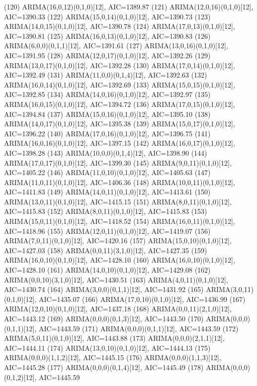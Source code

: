 \documentclass[12pt,letterpaper]{article}   %
\begin{document}
\begin{smallconsole}[caption={Modelos Ordenados por AIC}]
(120) ARIMA(16,0,12)(0,1,0)[12], AIC=1389.87
(121) ARIMA(12,0,16)(0,1,0)[12], AIC=1390.33
(122) ARIMA(15,0,14)(0,1,0)[12], AIC=1390.73
(123) ARIMA(14,0,15)(0,1,0)[12], AIC=1390.78
(124) ARIMA(17,0,13)(0,1,0)[12], AIC=1390.81
(125) ARIMA(16,0,13)(0,1,0)[12], AIC=1390.83
(126) ARIMA(6,0,0)(0,1,1)[12], AIC=1391.61
(127) ARIMA(13,0,16)(0,1,0)[12], AIC=1391.95
(128) ARIMA(12,0,17)(0,1,0)[12], AIC=1392.26
(129) ARIMA(13,0,17)(0,1,0)[12], AIC=1392.28
(130) ARIMA(17,0,14)(0,1,0)[12], AIC=1392.49
(131) ARIMA(11,0,0)(0,1,4)[12], AIC=1392.63
(132) ARIMA(16,0,14)(0,1,0)[12], AIC=1392.69
(133) ARIMA(15,0,15)(0,1,0)[12], AIC=1392.85
(134) ARIMA(14,0,16)(0,1,0)[12], AIC=1392.97
(135) ARIMA(16,0,15)(0,1,0)[12], AIC=1394.72
(136) ARIMA(17,0,15)(0,1,0)[12], AIC=1394.84
(137) ARIMA(15,0,16)(0,1,0)[12], AIC=1395.10
(138) ARIMA(14,0,17)(0,1,0)[12], AIC=1395.38
(139) ARIMA(15,0,17)(0,1,0)[12], AIC=1396.22
(140) ARIMA(17,0,16)(0,1,0)[12], AIC=1396.75
(141) ARIMA(16,0,16)(0,1,0)[12], AIC=1397.15
(142) ARIMA(16,0,17)(0,1,0)[12], AIC=1398.28
(143) ARIMA(10,0,0)(0,1,4)[12], AIC=1398.90
(144) ARIMA(17,0,17)(0,1,0)[12], AIC=1399.30
(145) ARIMA(9,0,11)(0,1,0)[12], AIC=1405.22
(146) ARIMA(11,0,10)(0,1,0)[12], AIC=1405.63
(147) ARIMA(11,0,11)(0,1,0)[12], AIC=1406.36
(148) ARIMA(10,0,11)(0,1,0)[12], AIC=1411.83
(149) ARIMA(14,0,11)(0,1,0)[12], AIC=1413.61
(150) ARIMA(13,0,11)(0,1,0)[12], AIC=1415.15
(151) ARIMA(8,0,11)(0,1,0)[12], AIC=1415.83
(152) ARIMA(8,0,11)(0,1,0)[12], AIC=1415.83
(153) ARIMA(15,0,11)(0,1,0)[12], AIC=1418.52
(154) ARIMA(16,0,11)(0,1,0)[12], AIC=1418.96
(155) ARIMA(12,0,11)(0,1,0)[12], AIC=1419.07
(156) ARIMA(7,0,11)(0,1,0)[12], AIC=1420.16
(157) ARIMA(15,0,10)(0,1,0)[12], AIC=1427.03
(158) ARIMA(0,0,11)(3,1,0)[12], AIC=1427.35
(159) ARIMA(16,0,10)(0,1,0)[12], AIC=1428.10
(160) ARIMA(16,0,10)(0,1,0)[12], AIC=1428.10
(161) ARIMA(14,0,10)(0,1,0)[12], AIC=1429.08
(162) ARIMA(0,0,10)(3,1,0)[12], AIC=1430.51
(163) ARIMA(4,0,11)(0,1,0)[12], AIC=1430.74
(164) ARIMA(3,0,0)(0,1,1)[12], AIC=1431.92
(165) ARIMA(3,0,11)(0,1,0)[12], AIC=1435.07
(166) ARIMA(17,0,10)(0,1,0)[12], AIC=1436.99
(167) ARIMA(12,0,10)(0,1,0)[12], AIC=1437.18
(168) ARIMA(0,0,11)(2,1,0)[12], AIC=1443.12
(169) ARIMA(0,0,0)(0,1,3)[12], AIC=1443.50
(170) ARIMA(0,0,0)(0,1,1)[12], AIC=1443.59
(171) ARIMA(0,0,0)(0,1,1)[12], AIC=1443.59
(172) ARIMA(5,0,11)(0,1,0)[12], AIC=1443.88
(173) ARIMA(0,0,0)(2,1,1)[12], AIC=1444.11
(174) ARIMA(13,0,10)(0,1,0)[12], AIC=1444.13
(175) ARIMA(0,0,0)(1,1,2)[12], AIC=1445.15
(176) ARIMA(0,0,0)(1,1,3)[12], AIC=1445.28
(177) ARIMA(0,0,0)(0,1,4)[12], AIC=1445.49
(178) ARIMA(0,0,0)(0,1,2)[12], AIC=1445.59

\end{smallconsole}
\end{document}
